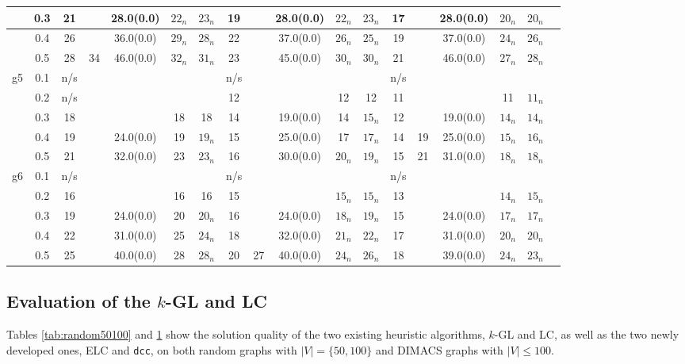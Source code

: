 \documentclass[10pt]{article}
\begin{document}
\begin{table}[H]
\begin{tabular}{|c|c|c|c|c|c|c||c|c|c|c|c||c|c|c|c|c|c|}
	\hline
	&0.3&21& & 28.0(0.0) & $22_n$& $23_n$ &19 &  &28.0(0.0)& $22_n$ & $23_n$ & 17&&28.0(0.0)&$20_n$&$20_n$\\ 
	\hline
	&0.4&26&  & 36.0(0.0) & $29_n$& $28_n$ & 22 &  & 37.0(0.0) &$26_n$ & $25_n$ & 19&&37.0(0.0)&$24_n$&$26_n$\\ 
	\hline
	&0.5&28& 34 & 46.0(0.0) & $32_n$& $31_n$ & 23&  & 45.0(0.0) & $30_n$ & $30_n$ & 21&&46.0(0.0)&$27_n$&$28_n$\\ 
	\hline
	g5&0.1&n/s&  & & & &n/s&  &  &  &  & n/s&&&&\\ 
	\hline
	&0.2&n/s&  & & & &12 & & & 12 & 12 & 11&&&11&$11_n$\\ 
	\hline
	&0.3&18& &  & 18& 18&14 &  &19.0(0.0)& 14 & $15_n$ & 12&&19.0(0.0)&$14_n$&$14_n$\\ 
	\hline
	&0.4&19&  & 24.0(0.0) & 19& $19_n$ & 15 &  & 25.0(0.0) &17 & $17_n$ & 14&19&25.0(0.0)&$15_n$&$16_n$\\ 
	\hline
	&0.5&21& & 32.0(0.0) & 23& $23_n$ & 16&  & 30.0(0.0) & $20_n$ & $19_n$ & 15&21&31.0(0.0)&$18_n$&$18_n$\\ 
	\hline
	g6&0.1&n/s&  & & & &n/s&  &  &  &  & n/s&&&&\\ 
	\hline
	&0.2&16&  & &16 &16 &15 & & & $15_n$ & $15_n$ & 13&&&$14_n$&$15_n$\\ 
	\hline
	&0.3&19& & 24.0(0.0) & 20& $20_n$&16 &  &24.0(0.0)& $18_n$ & $19_n$ & 15&&24.0(0.0)&$17_n$&$17_n$\\ 
	\hline
	&0.4&22&  & 31.0(0.0) & 25& $24_n$ & 18 &  & 32.0(0.0) &$21_n$ & $22_n$ & 17&&31.0(0.0)&$20_n$&$20_n$\\ 
	\hline
	&0.5&25& & 40.0(0.0) & 28& $28_n$ & 20&  27& 40.0(0.0) & $24_n$ & $26_n$ & 18&&39.0(0.0)&$24_n$&$23_n$\\ 
	\hline
  \end{tabular}

    \label{tab:dimacs}
\end{table}

\subsection{Evaluation of the $k$-GL and LC}\label{sec:heur-evaluation} 

Tables \ref{tab:random50100} and \ref{tab:dimacs} show the solution quality of the two 
existing heuristic algorithms, $k$-GL and LC, as well as the two newly developed ones, ELC and \texttt{dcc}, on
both random graphs with $|V| = \{50, 100 \}$ and DIMACS graphs with $|V| \leq 100$.
\end{document}
